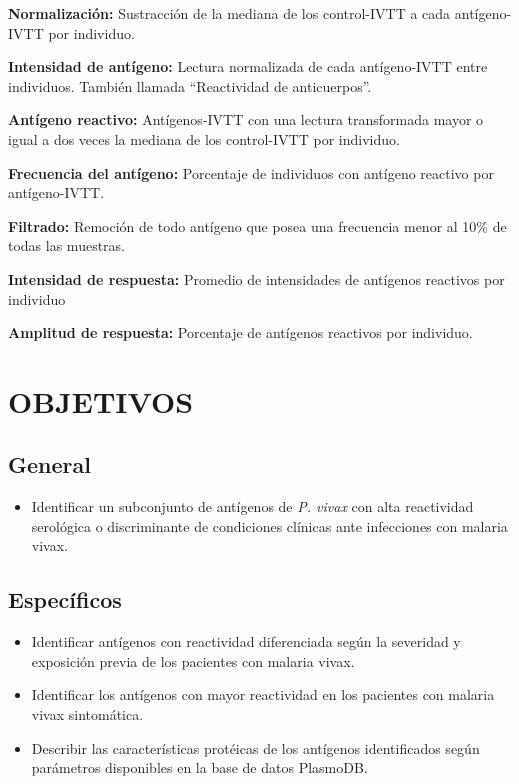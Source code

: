 \documentclass[]{article}
\providecommand{\tightlist}{%
  \setlength{\itemsep}{0pt}\setlength{\parskip}{0pt}}
\begin{document}
\textbf{Normalización:} Sustracción de la mediana de los control-IVTT a
cada antígeno-IVTT por individuo.

\textbf{Intensidad de antígeno:} Lectura normalizada de cada
antígeno-IVTT entre individuos. También llamada ``Reactividad de
anticuerpos''.

\textbf{Antígeno reactivo:} Antígenos-IVTT con una lectura transformada
mayor o igual a dos veces la mediana de los control-IVTT por individuo.

\textbf{Frecuencia del antígeno:} Porcentaje de individuos con antígeno
reactivo por antígeno-IVTT.

\textbf{Filtrado:} Remoción de todo antígeno que posea una frecuencia
menor al 10\% de todas las muestras.

\textbf{Intensidad de respuesta:} Promedio de intensidades de antígenos
reactivos por individuo

\textbf{Amplitud de respuesta:} Porcentaje de antígenos reactivos por
individuo.

\section{OBJETIVOS}\label{objetivos}

\subsection{General}\label{general}

\begin{itemize}
\tightlist
\item
  Identificar un subconjunto de antígenos de \emph{P. vivax} con alta
  reactividad serológica o discriminante de condiciones clínicas ante
  infecciones con malaria vivax.
\end{itemize}

\subsection{Específicos}\label{especificos}

\begin{itemize}
\item
  Identificar antígenos con reactividad diferenciada según la severidad
  y exposición previa de los pacientes con malaria vivax.
\item
  Identificar los antígenos con mayor reactividad en los pacientes con
  malaria vivax sintomática.
\item
  Describir las características protéicas de los antígenos identificados
  según parámetros disponibles en la base de datos PlasmoDB.
\end{itemize}
\end{document}
